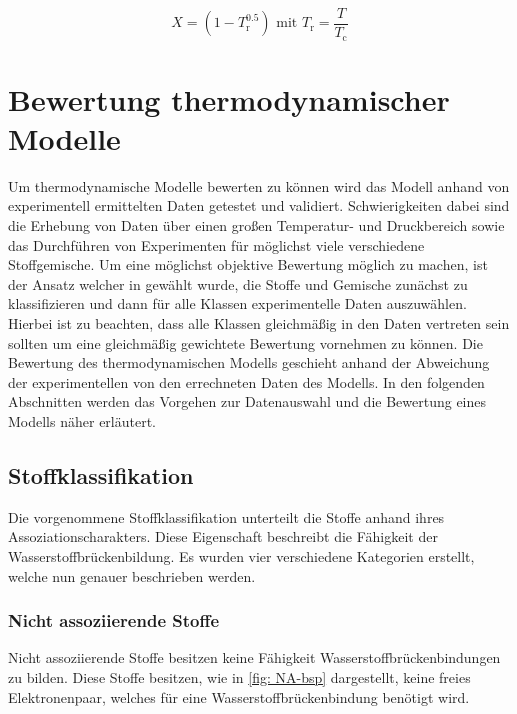 \documentclass[../thesis.tex]{subfiles}
\begin{document}
\begin{equation}
	X = \left( 1 - T_\mathrm{r}^{0\text{.}5} \right) \text{ mit } T_\mathrm{r} = \dfrac{T}{T_\mathrm{c}}
	\label{eq: a_i_sup}
\end{equation}

\section{Bewertung thermodynamischer Modelle}

Um thermodynamische Modelle bewerten zu können wird das Modell anhand von experimentell ermittelten Daten getestet und validiert. Schwierigkeiten dabei sind die Erhebung von Daten über einen großen Temperatur- und Druckbereich sowie das Durchführen von Experimenten für möglichst viele verschiedene Stoffgemische. Um eine möglichst objektive Bewertung möglich zu machen, ist der Ansatz welcher in \cite{jaubert2020benchmark} gewählt wurde, die Stoffe und Gemische zunächst zu klassifizieren und dann für alle Klassen experimentelle Daten auszuwählen. Hierbei ist zu beachten, dass alle Klassen gleichmäßig in den Daten vertreten sein sollten um eine gleichmäßig gewichtete Bewertung vornehmen zu können.
Die Bewertung des thermodynamischen Modells geschieht anhand der Abweichung der experimentellen von den errechneten Daten des Modells.
In den folgenden Abschnitten werden das Vorgehen zur Datenauswahl und die Bewertung eines Modells näher erläutert.

\subsection{Stoffklassifikation}
\label{sec: klassifikation}

Die vorgenommene Stoffklassifikation unterteilt die Stoffe anhand ihres Assoziationscharakters. Diese Eigenschaft beschreibt die Fähigkeit der Wasserstoffbrückenbildung. Es wurden vier verschiedene Kategorien erstellt, welche nun genauer beschrieben werden.

\subsubsection{Nicht assoziierende Stoffe}

Nicht assoziierende Stoffe besitzen keine Fähigkeit Wasserstoffbrückenbindungen zu bilden. Diese Stoffe besitzen, wie in \autoref{fig: NA-bsp} dargestellt, keine freies Elektronenpaar, welches für eine Wasserstoffbrückenbindung benötigt wird.
\end{document}

